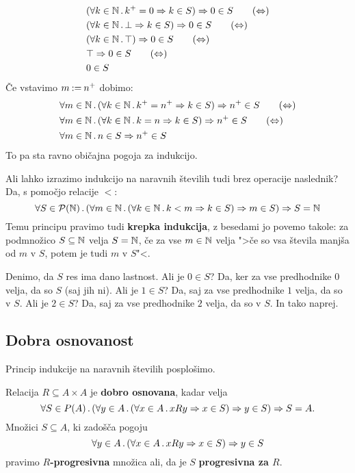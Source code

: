 %
\begin{align}
  &(\all{k \in \NN} \suc{k} = 0 \lthen k \in S) \lthen 0 \in S \tag{$\liff$} \\
  &(\all{k \in \NN} \bot \lthen k \in S) \lthen 0 \in S \tag{$\liff$} \\
  &(\all{k \in \NN} \top) \lthen 0 \in S \tag{$\liff$} \\
  &\top \lthen 0 \in S \tag{$\liff$} \\
  &0 \in S \notag
\end{align}
%
Če vstavimo $m \mathbin{{:}{=}} {n^{+}}$ dobimo:
%
\begin{align}
  &\all{m \in \NN} (\all{k \in \NN} \suc{k} = \suc{n} \lthen k \in S) \lthen \suc{n} \in S \tag{$\liff$} \\
  &\all{m \in \NN} (\all{k \in \NN} k = n \lthen k \in S) \lthen \suc{n} \in S \tag{$\liff$} \\
  &\all{m \in \NN} n \in S \lthen \suc{n} \in S \notag
\end{align}
%
To pa sta ravno običajna pogoja za indukcijo.

Ali lahko izrazimo indukcijo na naravnih številih tudi brez operacije naslednik?
Da, s pomočjo relacije $<$:
%
\begin{equation*}
    \forall S \in \mathcal{P}(\mathbb{N}) \,.\, (\forall m \in \mathbb{N} \,.\, (\forall k \in \mathbb{N} \,.\, k < m \Rightarrow k \in S) \Rightarrow m \in S) \Rightarrow S = \mathbb{N}
\end{equation*}
%
Temu principu pravimo tudi \textbf{krepka indukcija}, z besedami jo povemo takole: za podmnožico $S \subseteq \mathbb{N}$ velja
$S = \mathbb{N}$, če za vse $m \in \mathbb{N}$ velja ">če so vsa števila manjša od $m$ v $S$, potem je tudi $m$ v $S$"<.

Denimo, da $S$ res ima dano lastnost. Ali je $0 \in S$? Da, ker za vse predhodnike $0$ velja, da
so $S$ (saj jih ni). Ali je $1 \in S$? Da, saj za vse predhodnike $1$ velja, da so v $S$. Ali je $2 \in
S$? Da, saj za vse predhodnike $2$ velja, da so v $S$. In tako naprej.


\subsection{Dobra osnovanost}

Princip indukcije na naravnih številih posplošimo.

\begin{definicija}
  Relacija $R \subseteq A \times A$ je \textbf{dobro osnovana}, kadar velja
  \begin{equation*}
    \forall S \in P(A) \,.\, (\forall y \in A \,.\, (\forall x \in A \,.\, x R y \Rightarrow x \in S) \Rightarrow y \in S) \Rightarrow S = A.
  \end{equation*}
  Množici $S \subseteq A$, ki zadošča pogoju
  \begin{equation*}
  \forall y \in A \,.\, (\forall x \in A \,.\, x R y \Rightarrow x \in S) \Rightarrow y \in S
  \end{equation*}
  pravimo \textbf{$R$-progresivna} množica ali, da je $S$ \textbf{progresivna za $R$}.
\end{definicija}


